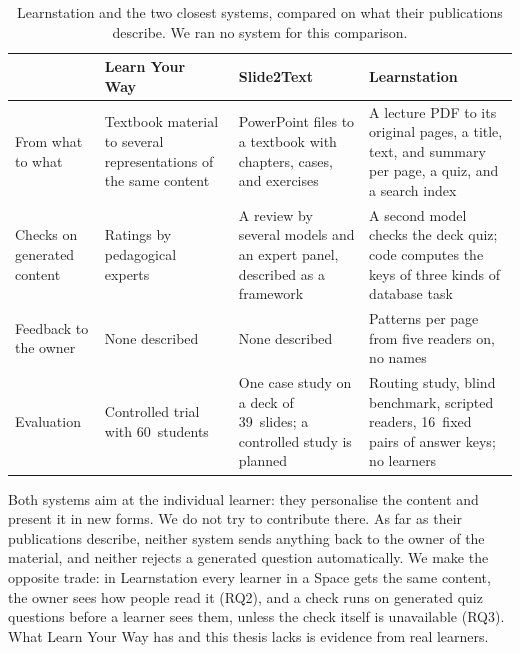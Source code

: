 \begin{table}[tbp]
  \centering\small
  \caption{Learnstation and the two closest systems, compared on what their
    publications describe. We ran no system for this comparison.}
  \label{tab:related}
  \newcommand*{\rr}{\raggedright\hspace{0pt}}
  \begin{tabular}{@{}p{}p{}p{}p{}@{}}
    \toprule
     & \textbf{Learn Your Way}~\cite{learnlm2025textbook}
     & \textbf{Slide2Text}~\cite{zhou2025slide2text}
     & \textbf{Learnstation} \tabularnewline
    \midrule
    \rr From what to what &
      \rr Textbook material to several representations of the same content &
      \rr PowerPoint files to a textbook with chapters, cases, and exercises &
      \rr A lecture PDF to its original pages, a title, text, and summary per
      page, a quiz, and a search index \tabularnewline
    \rr Checks on generated content &
      \rr Ratings by pedagogical experts &
      \rr A review by several models and an expert panel, described as a
      framework &
      \rr A second model checks the deck quiz; code computes the keys of three
      kinds of database task \tabularnewline
    \rr Feedback to the owner &
      \rr None described &
      \rr None described &
      \rr Patterns per page from five readers on, no names \tabularnewline
    \rr Evaluation &
      \rr Controlled trial with 60~students &
      \rr One case study on a deck of 39~slides; a controlled study is
      planned &
      \rr Routing study, blind benchmark, scripted readers, 16~fixed pairs of
      answer keys; no learners \tabularnewline
    \bottomrule
  \end{tabular}
\end{table}

Both systems aim at the individual learner: they personalise the content and
present it in new forms. We do not try to contribute there. As far as their
publications describe, neither system sends anything back to the owner of the
material, and neither rejects a generated question automatically. We make the
opposite trade: in Learnstation every learner in a Space gets the same
content, the owner sees how people read it (RQ2), and a check runs on
generated quiz questions before a learner sees them, unless the check itself
is unavailable (RQ3). What Learn Your Way has and this thesis lacks is
evidence from real learners.
